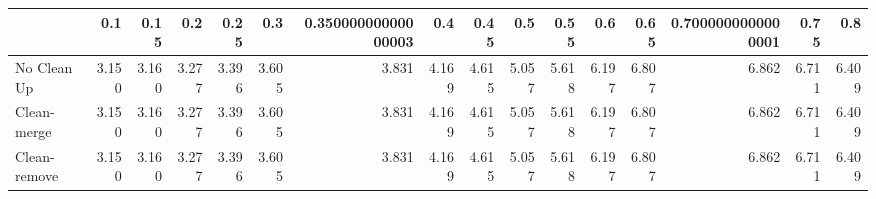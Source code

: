 \begin{tabular}{lrrrrrrrrrrrrrrr}
\toprule
{} &   0.1 &  0.15 &   0.2 &  0.25 &   0.3 & 0.35000000000000003 &   0.4 &  0.45 &   0.5 &  0.55 &   0.6 &  0.65 & 0.7000000000000001 &  0.75 &   0.8 \\
\midrule
No Clean Up  & 3.150 & 3.160 & 3.277 & 3.396 & 3.605 &               3.831 & 4.169 & 4.615 & 5.057 & 5.618 & 6.197 & 6.807 &              6.862 & 6.711 & 6.409 \\
Clean-merge  & 3.150 & 3.160 & 3.277 & 3.396 & 3.605 &               3.831 & 4.169 & 4.615 & 5.057 & 5.618 & 6.197 & 6.807 &              6.862 & 6.711 & 6.409 \\
Clean-remove & 3.150 & 3.160 & 3.277 & 3.396 & 3.605 &               3.831 & 4.169 & 4.615 & 5.057 & 5.618 & 6.197 & 6.807 &              6.862 & 6.711 & 6.409 \\
\bottomrule
\end{tabular}
